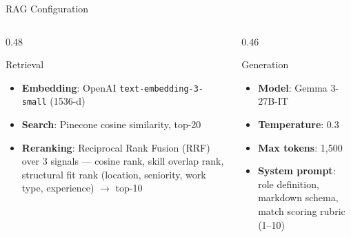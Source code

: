 \documentclass[aspectratio=169]{beamer}
\begin{document}
\begin{frame}{RAG Configuration}
  \begin{columns}[t]
    \begin{column}{0.48\textwidth}
      \begin{block}{Retrieval}
        \begin{itemize}\small\setlength{\itemsep}{5pt}
          \item \textbf{Embedding}: OpenAI \texttt{text-embedding-3-small} (1536-d)
          \item \textbf{Search}: Pinecone cosine similarity, top-20
          \item \textbf{Reranking}: Reciprocal Rank Fusion (RRF) over 3 signals --- cosine rank, skill overlap rank, structural fit rank (location, seniority, work type, experience) $\to$ top-10
        \end{itemize}
      \end{block}
    \end{column}
    \begin{column}{0.46\textwidth}
      \begin{block}{Generation}
        \begin{itemize}\small\setlength{\itemsep}{5pt}
          \item \textbf{Model}: Gemma 3-27B-IT
          \item \textbf{Temperature}: 0.3
          \item \textbf{Max tokens}: 1{,}500
          \item \textbf{System prompt}: role definition, markdown schema, match scoring rubric (1--10)
        \end{itemize}
      \end{block}
    \end{column}
  \end{columns}
\end{frame}
\end{document}
